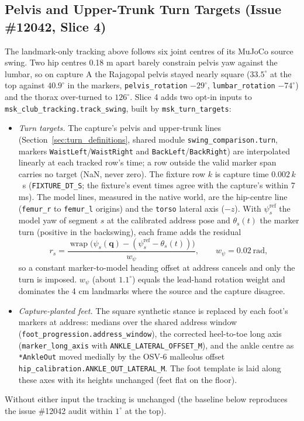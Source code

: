 \documentclass[11pt,a4paper]{article}
\begin{document}
\subsection{Pelvis and Upper-Trunk Turn Targets (Issue \#12042, Slice 4)}
\label{sec:osv9_turn_targets}
The landmark-only tracking above follows six joint centres of its MuJoCo
source swing. Two hip centres 0.18 m apart barely constrain pelvis yaw
against the lumbar, so on capture A the Rajagopal pelvis stayed nearly
square ($33.5^\circ$ at the top against $40.9^\circ$ in the markers,
\texttt{pelvis\_rotation} $-29^\circ$, \texttt{lumbar\_rotation} $-74^\circ$)
and the thorax over-turned to $126^\circ$. Slice 4 adds two opt-in inputs to
\texttt{msk\_club\_tracking.track\_swing}, built by
\texttt{msk\_turn\_targets}:
\begin{itemize}
\item \emph{Turn targets.} The capture's pelvis and upper-trunk lines
  (Section~\ref{sec:turn_definitions}, shared module
  \texttt{swing\_comparison.turn}, markers \texttt{WaistLeft}/\texttt{WaistRight}
  and \texttt{BackLeft}/\texttt{BackRight}) are interpolated linearly at each
  tracked row's time; a row outside the valid marker span carries no target
  (NaN, never zero). The fixture row $k$ is capture time $0.002\,k$~s
  (\texttt{FIXTURE\_DT\_S}; the fixture's event times agree with the
  capture's within 7 ms). The model lines, measured in the native world, are
  the hip-centre line (\texttt{femur\_r} to \texttt{femur\_l} origins) and
  the \texttt{torso} lateral axis ($-z$). With $\psi^{\mathrm{ref}}_s$ the
  model yaw of segment $s$ at the calibrated address pose and $\theta_s(t)$
  the marker turn (positive in the backswing), each frame adds the residual
  \begin{equation}
  r_s = \frac{\operatorname{wrap}\big(\psi_s(\mathbf{q}) -
  (\psi^{\mathrm{ref}}_s - \theta_s(t))\big)}{w_\psi},\qquad
  w_\psi = 0.02~\mathrm{rad},
  \end{equation}
  so a constant marker-to-model heading offset at address cancels and only
  the turn is imposed. $w_\psi$ (about $1.1^\circ$) equals the lead-hand
  rotation weight and dominates the 4 cm landmarks where the source and the
  capture disagree.
\item \emph{Capture-planted feet.} The square synthetic stance is replaced by
  each foot's markers at address: medians over the shared address window
  (\texttt{foot\_progression.address\_window}), the corrected heel-to-toe
  long axis (\texttt{marker\_long\_axis} with
  \texttt{ANKLE\_LATERAL\_OFFSET\_M}), and the ankle centre as
  \texttt{*AnkleOut} moved medially by the OSV-6 malleolus offset
  \texttt{hip\_calibration.ANKLE\_OUT\_LATERAL\_M}. The foot template is laid
  along these axes with its heights unchanged (feet flat on the floor).
\end{itemize}
Without either input the tracking is unchanged (the baseline below
reproduces the issue \#12042 audit within $1^\circ$ at the top).
\end{document}
